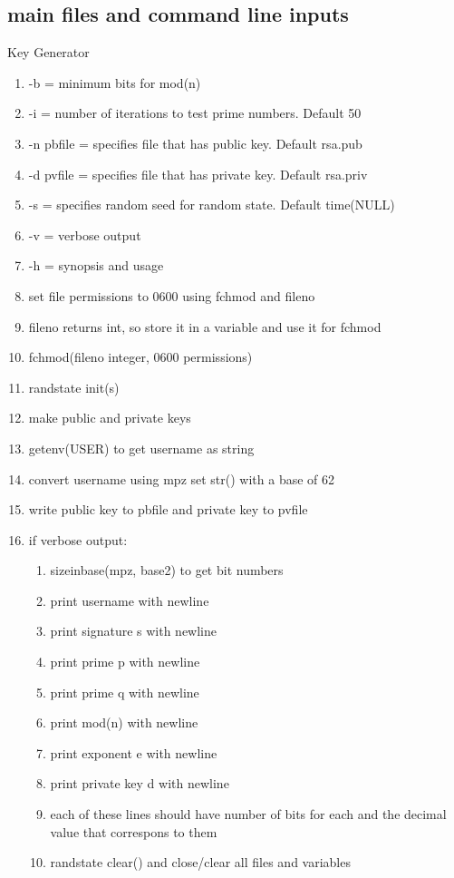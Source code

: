 \documentclass[11pt]{article}
\begin{document}
\begin{enumerate}
\section{main files and command line inputs}\label{ss:main}
Key Generator
\begin{enumerate}
\item -b = minimum bits for mod(n)
\item -i = number of iterations to test prime numbers. Default 50
\item -n pbfile = specifies file that has public key. Default rsa.pub
\item -d pvfile = specifies file that has private key. Default rsa.priv
\item -s = specifies random seed for random state. Default time(NULL)
\item -v  = verbose output
\item -h = synopsis and usage
\item set file permissions to 0600 using fchmod and fileno
\item fileno returns int, so store it in a variable and use it for fchmod
\item fchmod(fileno integer, 0600 permissions)
\item randstate init(s)
\item make public and private keys
\item getenv(USER) to get username as string
\item convert username using mpz set str() with a base of 62
\item write public key to pbfile and private key to pvfile
\item if verbose output:
	\begin{enumerate}
	\item sizeinbase(mpz, base2) to get bit numbers
	\item print username with newline
	\item print signature s with newline
	\item print prime p with newline
	\item print prime q with newline
	\item print mod(n) with newline
	\item print exponent e with newline
	\item print private key d with newline
	\item each of these lines should have number of bits for each and the decimal value that correspons to them
\item randstate clear() and close/clear all files and variables

\end{enumerate}
\end{enumerate}
\end{enumerate}
\end{document}
